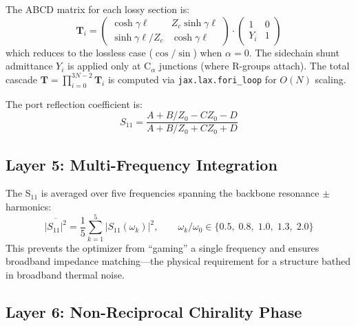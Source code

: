 The ABCD matrix for each lossy section is:
\begin{equation}
    \mathbf{T}_i = \begin{pmatrix} \cosh\gamma\ell & Z_c\sinh\gamma\ell \\ \sinh\gamma\ell/Z_c & \cosh\gamma\ell \end{pmatrix} \cdot \begin{pmatrix} 1 & 0 \\ Y_i & 1 \end{pmatrix}
    \label{eq:abcd_lossy}
\end{equation}
which reduces to the lossless case ($\cos/\sin$) when $\alpha = 0$.  The sidechain shunt admittance $Y_i$ is applied only at C$_\alpha$ junctions (where R-groups attach).  The total cascade $\mathbf{T} = \prod_{i=0}^{3N-2} \mathbf{T}_i$ is computed via \texttt{jax.lax.fori\_loop} for $O(N)$ scaling.

The port reflection coefficient is:
\begin{equation}
    S_{11} = \frac{A + B/Z_0 - CZ_0 - D}{A + B/Z_0 + CZ_0 + D}
    \label{eq:s11_from_abcd}
\end{equation}

\subsection{Layer 5: Multi-Frequency Integration}

The S$_{11}$ is averaged over five frequencies spanning the backbone resonance $\pm$ harmonics:
\begin{equation}
    \overline{|S_{11}|^2} = \frac{1}{5} \sum_{k=1}^{5} |S_{11}(\omega_k)|^2, \qquad \omega_k / \omega_0 \in \{0.5,\; 0.8,\; 1.0,\; 1.3,\; 2.0\}
    \label{eq:multi_freq}
\end{equation}
This prevents the optimizer from ``gaming'' a single frequency and ensures broadband impedance matching---the physical requirement for a structure bathed in broadband thermal noise.

\subsection{Layer 6: Non-Reciprocal Chirality Phase}

